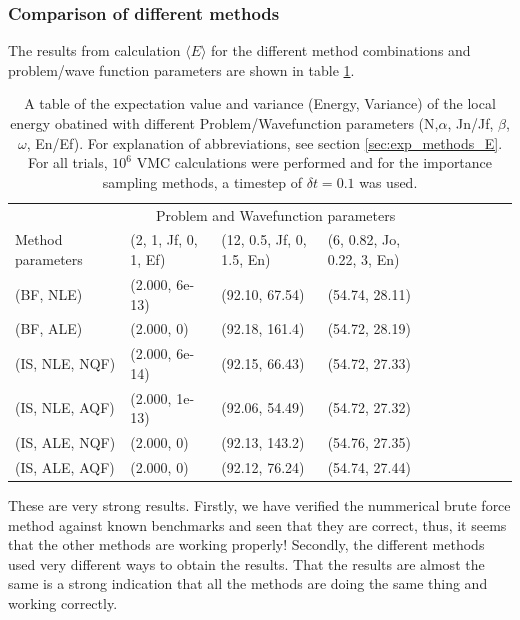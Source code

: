 \subsubsection{Comparison of different methods}\label{sec:res_methods_E}

The results from calculation $\langle E \rangle$ for the different method combinations and problem/wave function parameters are shown in table \ref{tab:methods_E}.

\begin{table}[h!]
	\centering
	\begin{tabular}{l @{ } l @{ } l @{ } l @{ } l @{ } l @{ } l  @{ } l  @{ } l  @{ } l }
	\toprule
	  & \multicolumn{3}{c}{Problem and Wavefunction parameters} \\
	 Method parameters $~~~~$ & (2, 1, Jf, 0, 1, Ef) $~$ & (12, 0.5, Jf, 0, 1.5, En) $~$ & (6, 0.82, Jo, 0.22, 3, En)  \\
	\midrule
	(BF, NLE) & 				(2.000, 6e-13)		&		(92.10, 67.54)		&		(54.74, 28.11)			\\
	\shaderow (BF, ALE)	 &		(2.000, 0)			&		(92.18, 161.4)		&		(54.72, 28.19)		\\
	(IS, NLE, NQF) & 			(2.000, 6e-14)		&		(92.15, 66.43)		&		(54.72, 27.33)				 \\
	\shaderow(IS, NLE, AQF) &	(2.000, 1e-13) 		&		(92.06, 54.49)		&		(54.72, 27.32)						\\
	(IS, ALE, NQF) &			(2.000, 0)			&		(92.13, 143.2)		&		(54.76, 27.35)					\\
	\shaderow (IS, ALE, AQF) &	(2.000, 0) 			&		(92.12, 76.24)		&		(54.74, 27.44)	 				\\
	\bottomrule
	\end{tabular}
	\caption{A table of the expectation value and variance (Energy, Variance) of the local energy obatined with different Problem/Wavefunction parameters (N,$\alpha$, Jn/Jf, $\beta$, $\omega$, En/Ef). For explanation of abbreviations, see section \ref{sec:exp_methods_E}.
	For all trials, $10^6$ VMC calculations were performed and for the importance sampling methods, a timestep of $\delta t = 0.1$ was used.}
	\label{tab:methods_E}
\end{table}

These are very strong results. 
Firstly, we have verified the nummerical brute force method against known benchmarks and seen that they are correct,
thus, it seems that the other methods are working properly!
Secondly, the different methods used very different ways to obtain the results. 
That the results are almost the same is a strong indication that all the methods are doing the same thing and working correctly. 















